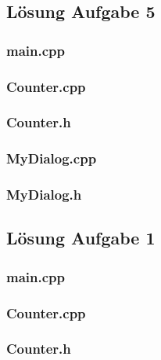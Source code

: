 \subsection{Lösung Aufgabe 5}
\subsubsection{main.cpp}

\subsubsection{Counter.cpp}

\subsubsection{Counter.h}

\subsubsection{MyDialog.cpp}

\subsubsection{MyDialog.h}


\setcounter{section}{13}
\setcounter{subsection}{1}

\subsection{Lösung Aufgabe 1}
\subsubsection{main.cpp}

\subsubsection{Counter.cpp}

\subsubsection{Counter.h}

